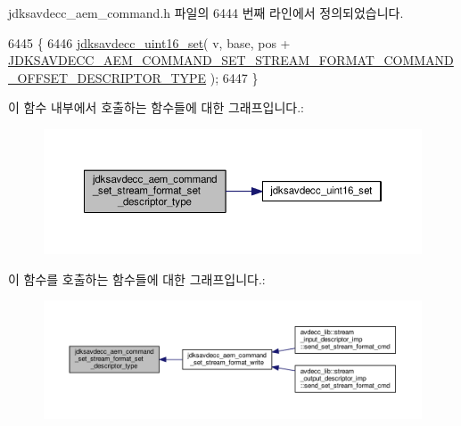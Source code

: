 jdksavdecc\+\_\+aem\+\_\+command.\+h 파일의 6444 번째 라인에서 정의되었습니다.


\begin{DoxyCode}
6445 \{
6446     \hyperlink{group__endian_ga14b9eeadc05f94334096c127c955a60b}{jdksavdecc\_uint16\_set}( v, base, pos + 
      \hyperlink{group__command__set__stream__format_ga25da528fd42f5ef79193b65ef514b56c}{JDKSAVDECC\_AEM\_COMMAND\_SET\_STREAM\_FORMAT\_COMMAND\_OFFSET\_DESCRIPTOR\_TYPE}
       );
6447 \}
\end{DoxyCode}


이 함수 내부에서 호출하는 함수들에 대한 그래프입니다.\+:
\nopagebreak
\begin{figure}[H]
\begin{center}
\leavevmode
\includegraphics[width=350pt]{group__command__set__stream__format_gae903701f88374d00fc86590fd25c0336_cgraph}
\end{center}
\end{figure}




이 함수를 호출하는 함수들에 대한 그래프입니다.\+:
\nopagebreak
\begin{figure}[H]
\begin{center}
\leavevmode
\includegraphics[width=350pt]{group__command__set__stream__format_gae903701f88374d00fc86590fd25c0336_icgraph}
\end{center}
\end{figure}


